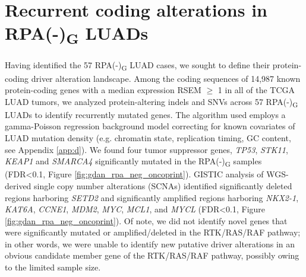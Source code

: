 \documentclass[phd,tocprelim]{cornell}
\begin{document}
\section{Recurrent coding alterations in RPA(-)\textsubscript{G} LUADs}
Having identified the 57 RPA(-)\textsubscript{G} LUAD cases, we sought to define their protein-coding driver alteration landscape. Among the coding sequences of 14,987 known protein-coding genes with a median expression RSEM $\ge$ 1 in all of the TCGA LUAD tumors, we analyzed protein-altering indels and SNVs across 57 RPA(-)\textsubscript{G} LUADs to identify recurrently mutated genes. The algorithm used employs a gamma-Poisson regression background model \cite{Imielinski2017-nt} correcting for known covariates of LUAD mutation density (e.g. chromatin state, replication timing, GC content, see Appendix \ref{app:d}). We found four tumor suppressor genes, \textit{TP53}, \textit{STK11}, \textit{KEAP1} and \textit{SMARCA4} significantly mutated in the RPA(-)\textsubscript{G} samples (FDR<0.1, Figure \ref{fig:gdan_rpa_neg_oncoprint}). GISTIC analysis \cite{Mermel2011-gt} of WGS-derived single copy number alterations (SCNAs) identified significantly deleted regions harboring \textit{SETD2} and significantly amplified regions harboring \textit{NKX2-1}, \textit{KAT6A}, \textit{CCNE1}, \textit{MDM2}, \textit{MYC}, \textit{MCL1}, and \textit{MYCL} (FDR<0.1, Figure \ref{fig:gdan_rpa_neg_oncoprint}). Of note, we did not identify novel genes that were significantly mutated or amplified/deleted in the RTK/RAS/RAF pathway; in other words, we were unable to identify new putative driver alterations in an obvious candidate member gene of the RTK/RAS/RAF pathway, possibly owing to the limited sample size.


\end{document}
